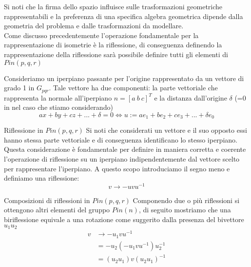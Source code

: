 \begin{frame}
    Si noti che la firma dello spazio influisce sulle trasformazioni geometriche rappresentabili e la preferenza di una specifica algebra geometrica dipende dalla geometria del problema e dalle trasformazioni da modellare.\\
   Come discusso precedentemente l’operazione fondamentale per la rappresentazione di isometrie è la riflessione, di conseguenza definendo la rappresentazione della riflessione sarà possibile definire tutti gli elementi di \(Pin(p,q,r)\)
\end{frame}

\begin{frame}
    Consideriamo un iperpiano passante per l’origine rappresentato da un vettore di grado 1 in \(G_{pqr}\). 
   Tale vettore ha due componenti: la parte vettoriale che rappresenta la normale all’iperpiano \(n=[a\ b\ c]^{T}\) e la distanza dall’origine \(\delta\) (=0 in nel caso che stiamo considerando)
   \[
      ax+by+cz+...+\delta =0 \iff u:= ae_1+be_2+ce_3+...+\delta e_0
   \]
\end{frame}

\begin{frame}{Riflessione in \(Pin(p,q,r)\)}
   Si noti che considerati un vettore e il suo opposto essi hanno stessa parte vettoriale e di conseguenza identificano lo stesso iperpiano. 
   Questa considerazione è fondamentale per definire in maniera corretta e coerente l’operazione di riflessione su un iperpiano indipendentemente dal vettore scelto per rappresentare l’iperpiano.
   A questo scopo introduciamo il segno meno e definiamo una riflessione:
   \begin{equation}
      v\to -uvu^{-1}
   \end{equation}
\end{frame}

\begin{frame}{Composizioni di riflessioni in \(Pin(p,q,r)\)}
   Componendo due o più riflessioni si ottengono altri elementi del gruppo \(Pin(n)\), di seguito mostriamo che una biriflessione equivale a una rotazione come suggerito dalla presenza del bivettore \(u_{1}u_{2}\)
   \[
   \begin{aligned}
      v &\to -u_1vu^{-1}\\
      &=-u_2(-u_1vu^{-1})u_2^{-1}\\
      &=(u_2u_1)v(u_2u_1)^{-1}
   \end{aligned}
   \]
\end{frame}


